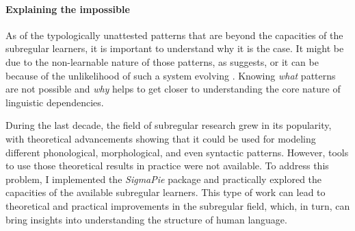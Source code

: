 \paragraph{Explaining the impossible}

As of the typologically unattested patterns that are beyond the capacities of the subregular learners, it is important to understand why it is the case.
It might be due to the non-learnable nature of those patterns, as \cite{Lai15} suggests, or it can be because of the unlikelihood of such a system evolving \citep{Blevins2004}.
Knowing \emph{what} patterns are not possible and \emph{why} helps to get closer to understanding the core nature of linguistic dependencies.


\bigskip\medskip
During the last decade, the field of subregular research grew in its popularity, with theoretical advancements showing that it could be used for modeling different phonological, morphological, and even syntactic patterns.
However, tools to use those theoretical results in practice were not available.
To address this problem, I implemented the \emph{SigmaPie} \href{https://pypi.org/project/SigmaPie/}{\faCube} package and practically explored the capacities of the available subregular learners.
This type of work can lead to theoretical and practical improvements in the subregular field, which, in turn, can bring insights into understanding the structure of human language.